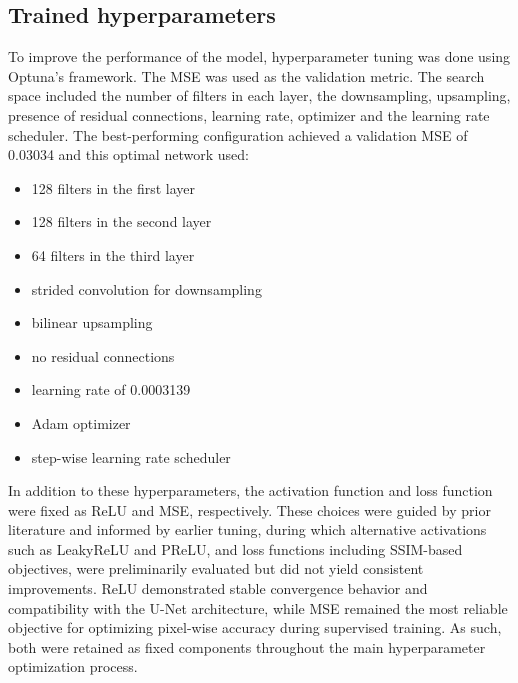 \documentclass[twocolumn]{article}
\begin{document}
\begin{table}[h]
    \centering
    \caption{\label{tab:mouse_distribution} Mouse distribution across training, validation, and testing sets.}
\end{table}

\subsection{Trained hyperparameters}
To improve the performance of the model, hyperparameter tuning was done using Optuna's framework. 
The MSE was used as the validation metric. The search space included the number of filters in each layer, the downsampling, upsampling, presence of residual connections, learning rate, optimizer and the learning rate scheduler. 
The best-performing configuration achieved a validation MSE of 0.03034 and this optimal network used: 
\begin{itemize}
    \item 128 filters in the first layer
    \item 128 filters in the second layer
    \item 64 filters in the third layer
    \item strided convolution for downsampling
    \item bilinear upsampling
    \item no residual connections
    \item learning rate of 0.0003139
    \item Adam optimizer 
    \item step-wise learning rate scheduler
\end{itemize}
In addition to these hyperparameters, the activation function and loss function were fixed as ReLU and MSE, respectively. 
These choices were guided by prior literature and informed by earlier tuning, during which alternative activations such as LeakyReLU and PReLU, and loss functions including SSIM-based objectives, were preliminarily evaluated but did not yield consistent improvements. 
ReLU demonstrated stable convergence behavior and compatibility with the U-Net architecture, while MSE remained the most reliable objective for optimizing pixel-wise accuracy during supervised training.
As such, both were retained as fixed components throughout the main hyperparameter optimization process. 
\end{document}
